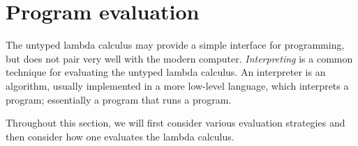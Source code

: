 \chapter{Program evaluation}\label{sec:eval}
The untyped lambda calculus may provide a simple interface for programming, but does not pair very well with the modern computer.
\textit{Interpreting} is a common technique for evaluating the untyped lambda calculus.
An interpreter is an algorithm, usually implemented in a more low-level language, which interprets a program; essentially a program that runs a program.

Throughout this section, we will first consider various evaluation strategies and then consider how one evaluates the lambda calculus.
\clearpage






